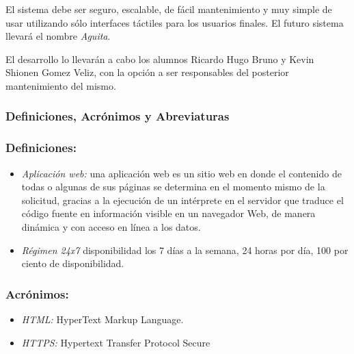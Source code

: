 El sistema debe ser seguro, escalable, de fácil mantenimiento y muy simple de usar utilizando sólo interfaces táctiles para los usuarios finales. El futuro sistema llevará el nombre \emph{Aguita}.

El desarrollo lo llevarán a cabo los alumnos Ricardo Hugo Bruno y Kevin Shionen Gomez Veliz, con la opción a ser responsables del posterior mantenimiento del mismo.

    \subsubsection{Definiciones, Acrónimos y Abreviaturas}
    \subsubsection{Definiciones:}
  
        \begin{itemize}
 
        \item \emph{Aplicación web:} una aplicación web es un sitio web en donde el contenido de todas o algunas de sus páginas se determina en el momento mismo de la solicitud, gracias a la ejecución de un intérprete en el servidor que traduce el código fuente en información visible en un navegador Web, de manera dinámica y con acceso en línea a los datos.
 
        \item \emph{Régimen 24x7} disponibilidad los 7 días a la semana, 24 horas por día, 100 por ciento de disponibilidad.
        \end{itemize}

        \subsubsection{Acrónimos:}

        \begin{itemize}

        \item \emph{HTML:} HyperText Markup Language.
        
        \item \emph{HTTPS:} Hypertext Transfer Protocol Secure

        \end{itemize}
 
